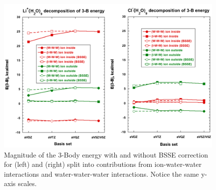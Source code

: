 \begin{figure}[h]
\uwsinglespace
\begin{center}
\includegraphics[width=\textwidth]{Figures/Chapter_3/figure_5_combined.png}
\end{center}
\caption[Magnitude of the 3-Body energy with and without BSSE correction for  (left) and  (right) split into contributions from ion-water-water interactions and water-water-water interactions. Notice the same y-axis scales.]{Magnitude of the 3-Body energy with and without BSSE correction for  (left) and  (right) split into contributions from ion-water-water interactions and water-water-water interactions. Notice the same y-axis scales.}
\label{fig:MBE_II_5}
\end{figure}